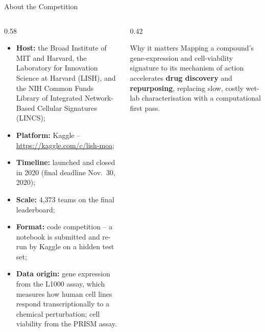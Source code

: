 \documentclass[9pt,aspectratio=169]{beamer}
\begin{document}
\begin{frame}{About the Competition}
  \begin{columns}[T]
    \begin{column}{0.58\textwidth}
      \begin{itemize}
        \item \textbf{Host:} the Broad Institute of MIT and Harvard, the Laboratory for Innovation Science at Harvard (LISH), and the NIH Common Funds Library of Integrated Network-Based Cellular Signatures (LINCS);
        \item \textbf{Platform:} Kaggle -- \url{https://kaggle.com/c/lish-moa};
        \item \textbf{Timeline:} launched and closed in 2020 (final deadline Nov.\ 30, 2020);
        \item \textbf{Scale:} 4,373 teams on the final leaderboard;
        \item \textbf{Format:} code competition -- a notebook is submitted and re-run by Kaggle on a hidden test set;
        \item \textbf{Data origin:} gene expression from the L1000 assay, which measures how human cell lines respond transcriptionally to a chemical perturbation; cell viability from the PRISM assay.
      \end{itemize}
    \end{column}
    \begin{column}{0.42\textwidth}
      \begin{block}{Why it matters}
        Mapping a compound's gene-expression and cell-viability signature to its mechanism of action accelerates \textbf{drug discovery} and \textbf{repurposing}, replacing slow, costly wet-lab characterisation with a computational first pass.
      \end{block}
    \end{column}
  \end{columns}
\end{frame}
\end{document}
